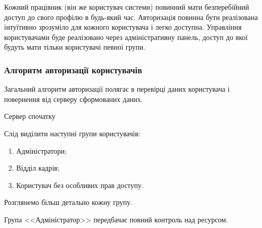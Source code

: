 Кожний працівник (він же користувач системи) повинний мати безперебійний доступ до свого профілю в будь-який час.
Авторизація повинна бути реалізована інтуїтивно зрозуміло для кожного користувача і легко доступна.
Управління користувачами буде реалізовано через адміністративну панель, доступ до якої будуть мати тільки користувачі певної групи.

\subsubsection{Алгоритм авторизації користувачів}
Загальний алгоритм авторизації полягає в перевірці даних користувача і повернення від серверу сформованих даних.
\par Сервер спочатку 

Слід виділити наступні групи користувачів:
\begin{enumerate}
	\item Адміністратори;
	\item Відділ кадрів;
	\item Користувач без особливих прав доступу.
\end{enumerate}

\par Розглянемо більш детально кожну групу. 
\par Група <<Адміністратор>> передбачає повний контроль над ресурсом. 


